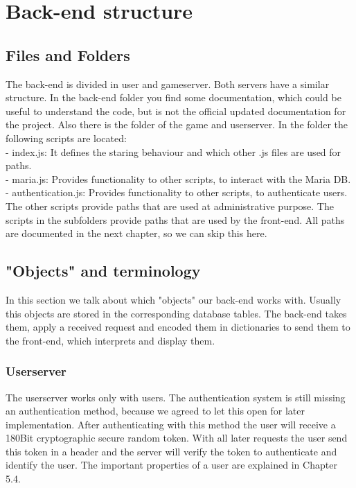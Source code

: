 \chapter{Back-end structure}
\section {Files and Folders}
The back-end is divided in user and gameserver. Both servers have a similar structure.
In the back-end folder you find some documentation, which could be useful to understand the code, but is not the official updated documentation for the project.  Also there is the folder of the game and userserver. In the folder the following scripts are located:\\
- index.js: It defines the staring behaviour and which other .js files are used for paths.\\
- maria.js: Provides functionality to other scripts, to interact with the Maria DB.\\
- authentication.js: Provides functionality to other scripts, to authenticate users.\\
The other scripts provide paths that are used at administrative purpose. The scripts in the subfolders provide paths that are used by the front-end. All paths are documented in the next chapter, so we can skip this here.\\

\section {"Objects" and terminology}
In this section we talk about which "objects" our back-end works with. Usually this objects are stored in the corresponding database tables. The back-end takes them, apply a received request and encoded them in dictionaries to send them to the front-end, which interprets and display them.\\

\subsection{Userserver}
The userserver works only with users. 
The authentication system is still missing an authentication method, because we agreed to let this open for later implementation. After authenticating with this method the user will receive a 180Bit cryptographic secure random token. With all later requests the user send this token in a header and the server will verify the token to authenticate and identify the user. The important properties of a user are explained in Chapter 5.4.

